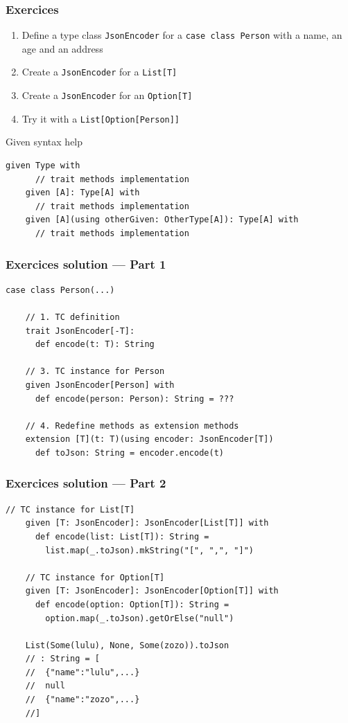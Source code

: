 \begin{frame}[fragile]
  \frametitle{Exercices}

  \begin{enumerate}
    \item Define a type class \texttt{JsonEncoder} for a \texttt{case class Person} with a name, an age and an address
    \item Create a \texttt{JsonEncoder} for a \texttt{List[T]}
    \item Create a \texttt{JsonEncoder} for an \texttt{Option[T]}
    \item Try it with a \texttt{List[Option[Person]]}
  \end{enumerate}

  Given syntax help
  \begin{lstlisting}[gobble=4]
    given Type with
      // trait methods implementation
    given [A]: Type[A] with
      // trait methods implementation
    given [A](using otherGiven: OtherType[A]): Type[A] with
      // trait methods implementation
  \end{lstlisting}
\end{frame}

\begin{frame}[fragile]
  \frametitle{Exercices solution --- Part 1}

  \begin{lstlisting}[gobble=4]
    case class Person(...)
    
    // 1. TC definition
    trait JsonEncoder[-T]:
      def encode(t: T): String 

    // 3. TC instance for Person
    given JsonEncoder[Person] with
      def encode(person: Person): String = ???

    // 4. Redefine methods as extension methods
    extension [T](t: T)(using encoder: JsonEncoder[T])
      def toJson: String = encoder.encode(t)
  \end{lstlisting}

\end{frame}

\begin{frame}[fragile]
  \frametitle{Exercices solution --- Part 2}

  \begin{lstlisting}[gobble=4]
    // TC instance for List[T]
    given [T: JsonEncoder]: JsonEncoder[List[T]] with
      def encode(list: List[T]): String =
        list.map(_.toJson).mkString("[", ",", "]")

    // TC instance for Option[T]
    given [T: JsonEncoder]: JsonEncoder[Option[T]] with
      def encode(option: Option[T]): String =
        option.map(_.toJson).getOrElse("null")

    List(Some(lulu), None, Some(zozo)).toJson
    // : String = [
    //  {"name":"lulu",...}
    //  null
    //  {"name":"zozo",...}
    //]
  \end{lstlisting}
\end{frame}

